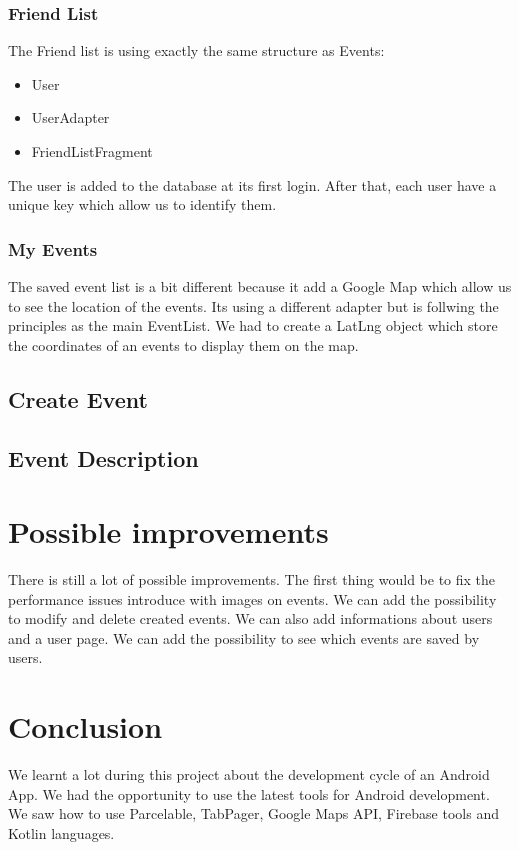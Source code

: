 \documentclass[a4paper,11pt, oneside]{book}
\begin{document}
		\subsection{Friend List}

		The Friend list is using exactly the same structure as Events:
		\begin{itemize}
			\item User 
			\item UserAdapter
			\item FriendListFragment
		\end{itemize}

		The user is added to the database at its first login. After that, each user have a unique key which allow us to identify
		them.

		\subsection{My Events}

		The saved event list is a bit different because it add a Google Map which allow us to see the location of the events. Its
		using a different adapter but is follwing the principles as the main EventList. We had to create a LatLng object which store
		the coordinates of an events to display them on the map.

		\section{Create Event}

		\section{Event Description}

	\chapter{Possible improvements}

	There is still a lot of possible improvements. The first thing would be to fix the performance issues introduce
	with images on events. We can add the possibility to modify and delete created events. We can also add informations about
	users and a user page. We can add the possibility to see which events are saved by users.

	\chapter{Conclusion}

	We learnt a lot during this project about the development cycle of an Android App. We had the opportunity to use the latest
	tools for Android development. We saw how to use Parcelable, TabPager, Google Maps API, Firebase tools and Kotlin languages.
\end{document}
